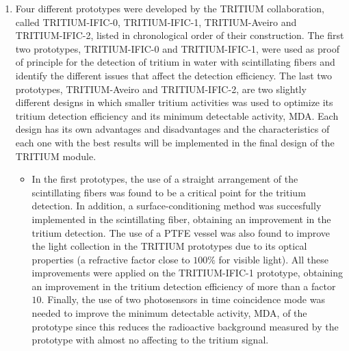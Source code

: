 \begin{enumerate}
\begin{enumerate}
\end{enumerate}


\item{} Four different prototypes were developed by the TRITIUM collaboration, called TRITIUM-IFIC-0, TRITIUM-IFIC-1, TRITIUM-Aveiro and TRITIUM-IFIC-2, listed in chronological order of their construction. The first two prototypes, TRITIUM-IFIC-0 and TRITIUM-IFIC-1, were used as proof of principle for the detection of tritium in water with scintillating fibers and identify the different issues that affect the detection efficiency. The last two prototypes, TRITIUM-Aveiro and TRITIUM-IFIC-2, are two slightly different designs in which smaller tritium activities was used to optimize its tritium detection efficiency and its minimum detectable activity, MDA. Each design has its own advantages and disadvantages and the characteristics of each one with the best results will be implemented in the final design of the TRITIUM module.

\begin{itemize}

\item{} In the first prototypes, the use of a straight arrangement of the scintillating fibers was found to be a critical point for the tritium detection. In addition, a surface-conditioning method was succesfully implemented in the scintillating fiber, obtaining an improvement in the tritium detection. The use of a PTFE vessel was also found to improve the light collection in the TRITIUM prototypes due to its optical properties (a refractive factor close to $100\%$ for visible light). All these improvements were applied on the TRITIUM-IFIC-1 prototype, obtaining an improvement in the tritium detection efficiency of more than a factor $10$. Finally, the use of two photosensors in time coincidence mode was needed to improve the minimum detectable activity, MDA, of the prototype since this reduces the radioactive background measured by the prototype with almost no affecting to the tritium signal.


\end{itemize}
\end{enumerate}
